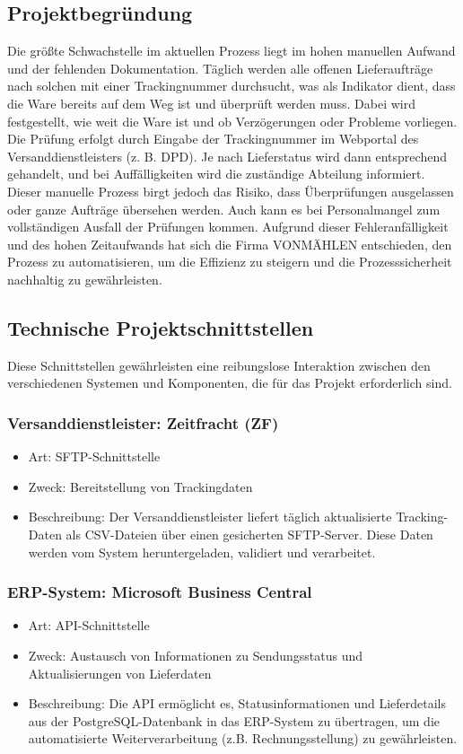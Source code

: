 \subsection{Projektbegründung} 
\label{sec:Projektbegruendung}
Die größte Schwachstelle im aktuellen Prozess liegt im hohen manuellen Aufwand und der fehlenden Dokumentation. 
Täglich werden alle offenen Lieferaufträge nach solchen mit einer Trackingnummer durchsucht, was als Indikator dient, 
dass die Ware bereits auf dem Weg ist und überprüft werden muss. Dabei wird festgestellt, wie weit die Ware ist und ob 
Verzögerungen oder Probleme vorliegen. Die Prüfung erfolgt durch Eingabe der Trackingnummer im Webportal des 
Versanddienstleisters (z. B. DPD). Je nach Lieferstatus wird dann entsprechend gehandelt, und bei Auffälligkeiten 
wird die zuständige Abteilung informiert. Dieser manuelle Prozess birgt jedoch das Risiko, dass Überprüfungen 
ausgelassen oder ganze Aufträge übersehen werden. Auch kann es bei Personalmangel zum vollständigen Ausfall der 
Prüfungen kommen. Aufgrund dieser Fehleranfälligkeit und des hohen Zeitaufwands hat sich die Firma VONMÄHLEN 
entschieden, den Prozess zu automatisieren, um die Effizienz zu steigern und die Prozesssicherheit nachhaltig zu 
gewährleisten.

\subsection{Technische Projektschnittstellen} 
\label{sec:Projektschnittstellen}
Diese Schnittstellen gewährleisten eine reibungslose Interaktion zwischen den verschiedenen Systemen und Komponenten, 
die für das Projekt erforderlich sind.

\subsubsection{Versanddienstleister: Zeitfracht (ZF)}
\begin{itemize}
\item Art: SFTP-Schnittstelle
\item Zweck: Bereitstellung von Trackingdaten
\item Beschreibung: Der Versanddienstleister liefert täglich aktualisierte Tracking-Daten als CSV-Dateien über einen 
gesicherten SFTP-Server. Diese Daten werden vom System heruntergeladen, validiert und verarbeitet.
\end{itemize}

\subsubsection{ERP-System: Microsoft Business Central}
\begin{itemize}
\item Art: API-Schnittstelle
\item Zweck: Austausch von Informationen zu Sendungsstatus und Aktualisierungen von Lieferdaten
\item Beschreibung: Die API ermöglicht es, Statusinformationen und Lieferdetails aus der 
PostgreSQL-Datenbank in das ERP-System zu übertragen, um die automatisierte Weiterverarbeitung 
(z.B. Rechnungsstellung) zu gewährleisten.
\end{itemize}


